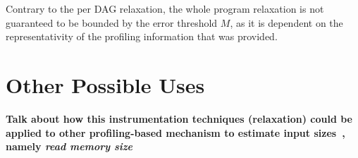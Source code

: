 Contrary to the per DAG relaxation, the whole program relaxation is not guaranteed to be bounded by the error threshold $M$,
as it is dependent on the representativity of the profiling information that was provided.

\section{Other Possible Uses}

\textbf{Talk about how this instrumentation techniques (relaxation) could be applied to other profiling-based mechanism to estimate input sizes~\citep{zaparanuks12,coppa14}, namely \textit{read memory size}}
